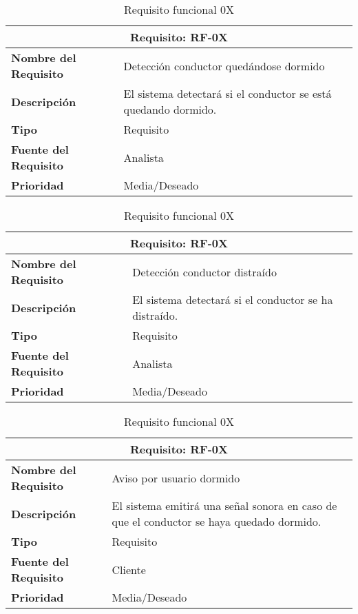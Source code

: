 \documentclass[10pt,a4paper,oldfontcommands]{dpds}
\begin{document}
\begin{table}[H]
\begin{center}
\begin{tabular}{p{} p{7cm}}
\multicolumn{2}{c}{\textbf{Requisito: RF-0X} } \\
\hline \hline
\textbf{Nombre del Requisito} & Detección conductor quedándose dormido\\
\textbf{Descripción} & El sistema detectará si el conductor se está quedando dormido.\\
\textbf{Tipo} & Requisito  \\
\textbf{Fuente del Requisito} & Analista  \\
\textbf{Prioridad} & Media/Deseado  \\ \hline
\end{tabular}
\caption{Requisito funcional 0X}
\label{tab:personal}
\end{center}
\end{table}

\begin{table}[H]
\begin{center}
\begin{tabular}{p{} p{7cm}}
\multicolumn{2}{c}{\textbf{Requisito: RF-0X} } \\
\hline \hline
\textbf{Nombre del Requisito} & Detección conductor distraído\\
\textbf{Descripción} & El sistema detectará si el conductor se ha distraído.\\
\textbf{Tipo} & Requisito  \\
\textbf{Fuente del Requisito} & Analista  \\
\textbf{Prioridad} & Media/Deseado  \\ \hline
\end{tabular}
\caption{Requisito funcional 0X}
\label{tab:personal}
\end{center}
\end{table}

\begin{table}[H]
\begin{center}
\begin{tabular}{p{} p{7cm}}
\multicolumn{2}{c}{\textbf{Requisito: RF-0X} } \\
\hline \hline
\textbf{Nombre del Requisito} & Aviso por usuario dormido\\
\textbf{Descripción} & El sistema emitirá una señal sonora en caso de que el conductor se haya quedado dormido.\\
\textbf{Tipo} & Requisito  \\
\textbf{Fuente del Requisito} & Cliente  \\
\textbf{Prioridad} & Media/Deseado  \\ \hline
\end{tabular}
\caption{Requisito funcional 0X}
\label{tab:personal}
\end{center}
\end{table}
\end{document}
